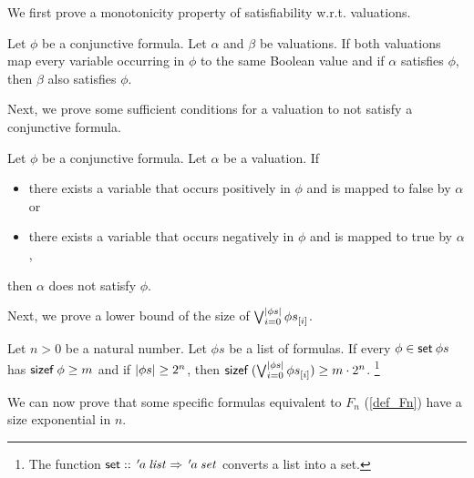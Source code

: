 \documentclass[a4paper,USenglish,cleveref, autoref, thm-restate]{lipics-v2021}
\theoremstyle{definition}
\begin{document}
We first prove a monotonicity property of satisfiability w.r.t. valuations.

\begin{lemma}
  \label{aux_lemma_prop4_step1}
  Let $\phi$ be a conjunctive formula.
  Let $\alpha$ and $\beta$ be valuations.
  If both valuations map every variable occurring in $\phi$ to the same Boolean value and
  if $\alpha$ satisfies $\phi$,
  then $\beta$ also satisfies $\phi$.
\end{lemma}

Next, we prove some sufficient conditions for a valuation to not satisfy a conjunctive formula.

\begin{lemma}
  \label{aux_lemma_prop4_step3}
  Let $\phi$ be a conjunctive formula.
  Let $\alpha$ be a valuation.
  If
  \begin{itemize}
    \item there exists a variable that occurs positively in $\phi$ and is mapped to false by $\alpha$ or
    \item there exists a variable that occurs negatively in $\phi$ and is mapped to true by $\alpha$,
  \end{itemize}
  then $\alpha$ does not satisfy $\phi$.
\end{lemma}

Next, we prove a lower bound of the size of $\bigvee_{i=0}^{\left|\phi{}s\right|} {\phi{}s}_{[i]}$.

\begin{lemma}
  \label{thm_exp_size}
  Let $n > 0$ be a natural number.
  Let $\phi{}s$ be a list of formulas.
  If every $\phi \in \mathsf{set} \> \phi{}s$ has $\mathsf{sizef} \> \phi \ge m$ and
  if $\left|\phi{}s\right| \ge 2^n$,
  then $\mathsf{sizef} \> (\bigvee_{i=0}^{\left|\phi{}s\right|} {\phi{}s}_{[i]}) \ge m \cdot 2^n$.%
  \footnote{The function $\mathsf{set} \mathrel{::} {\thinspace'}{\kern-.175ex a} \> \mathit{list} \Rightarrow {\thinspace'}{\kern-.175ex a} \> \mathit{set}$ converts a list into a set.}
\end{lemma}

We can now prove that some specific formulas equivalent to $F_n$ (\cref{def_Fn}) have a size exponential in $n$.
\end{document}
